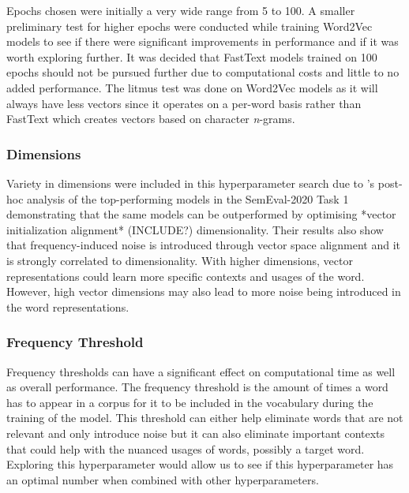 Epochs chosen were initially a very wide range from 5 to 100. A smaller preliminary test for higher epochs were conducted while training Word2Vec models to see if there were significant improvements in performance and if it was worth exploring further. It was decided that FastText models trained on 100 epochs should not be pursued further due to computational costs and little to no added performance. The litmus test was done on Word2Vec models as it will always have less vectors since it operates on a per-word basis rather than FastText which creates vectors based on character \emph{n}-grams. 

\subsubsection{Dimensions}
Variety in dimensions were included in this hyperparameter search due to \citet{kaiser-etal-2020-ims}’s post-hoc analysis of the top-performing models in the SemEval-2020 Task 1 demonstrating that the same models can be outperformed by optimising *vector initialization alignment* (INCLUDE?) dimensionality. Their results also show that frequency-induced noise is introduced through vector space alignment and it is strongly correlated to dimensionality. With higher dimensions, vector representations could learn more specific contexts and usages of the word. However, high vector dimensions may also lead to more noise being introduced in the word representations. 

\subsubsection{Frequency Threshold}
Frequency thresholds can have a significant effect on computational time as well as overall performance. The frequency threshold is the amount of times a word has to appear in a corpus for it to be included in the vocabulary during the training of the model. This threshold can either help eliminate words that are not relevant and only introduce noise but it can also eliminate important contexts that could help with the nuanced usages of words, possibly a target word. Exploring this hyperparameter would allow us to see if this hyperparameter has an optimal number when combined with other hyperparameters. 

